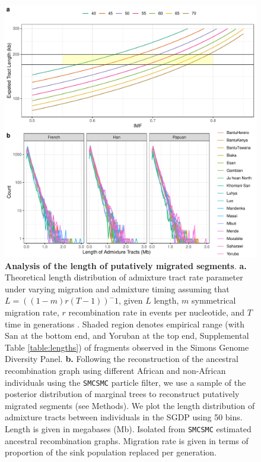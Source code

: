   


\begin{figure}
  \centering
  \includegraphics[width=\textwidth]{plot/both_length.pdf}
  \caption{ {\bf Analysis of the length of putatively migrated segments}. {\bf a.} Theoretical length distribution of admixture tract rate parameter under varying migration and admixture timing assuming that $L = ((1-m)r(T-1))^-1$, given $L$ length, $m$ symmetrical migration rate, $r$ recombination rate in events per nucleotide, and $T$ time in generations \cite{Liang953}. Shaded region denotes empirical range (with San at the bottom end, and Yoruban at the top end, Supplemental Table \ref{table:lengths}) of fragments observed in the Simons Genome Diversity Panel. {\bf b.} Following the reconstruction of the ancestral recombination graph using different African and non-African individuals using the {\tt SMCSMC} particle filter, we use a sample of the posterior distribution of marginal trees to reconstruct putatively migrated segments (see Methods). We plot the length distribution of admixture tracts between individuals in the SGDP using 50 bins. Length is given in megabases (Mb). Isolated from {\tt SMCSMC} estimated ancestral recombination graphs. Migration rate is given in terms of proportion of the sink population replaced per generation. }
  \label{fig:length}
\end{figure}


